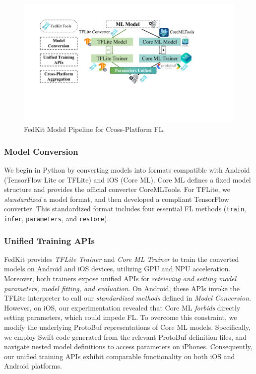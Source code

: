\documentclass[conference]{IEEEtran}
\begin{document}
\begin{figure}
    \centering
    \includegraphics*[width=\linewidth]{model_pipeline.pdf}
    \caption{FedKit Model Pipeline for Cross-Platform FL.}
    \label{cross_fl}
\end{figure}

\subsubsection{Model Conversion}
We begin in Python by converting models into formats compatible with
Android (TensorFlow Lite or TFLite) and iOS (Core ML).
Core ML defines a fixed model structure and provides
the official converter CoreMLTools.
For TFLite, we \textit{standardized} a model format, and then
developed a compliant TensorFlow converter.
This standardized format includes
four essential FL methods
(\lstinline{train}, \lstinline{infer}, \lstinline{parameters},
and \lstinline{restore}).


\subsubsection{Unified Training APIs}
FedKit provides \textit{TFLite Trainer} and \textit{Core ML Trainer} to
train the converted models on Android and iOS devices,
utilizing GPU and NPU acceleration.
Moreover, both trainers expose unified APIs for
\textit{retrieving and setting model parameters,
    model fitting, and evaluation}.
On Android, these APIs invoke the TFLite interpreter to call
our \textit{standardized methods} defined in \textit{Model Conversion}.
However, on iOS, our experimentation revealed that
Core ML \textit{forbids} directly setting parameters, which could impede FL.
To overcome this constraint,
we modify the underlying ProtoBuf representations of
Core ML models.
Specifically,
we employ Swift code generated from the relevant ProtoBuf definition files,
and navigate nested model definitions to access parameters on iPhones.
Consequently, our unified training APIs exhibit comparable functionality on
both iOS and Android platforms.
\end{document}
